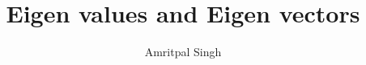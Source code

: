 \title{Eigen values and Eigen vectors}
\author{Amritpal Singh}

\begin{titlepage}
\maketitle

\tableofcontents
\thispagestyle{empty}
\listoffigures
\thispagestyle{empty}

\end{titlepage}

